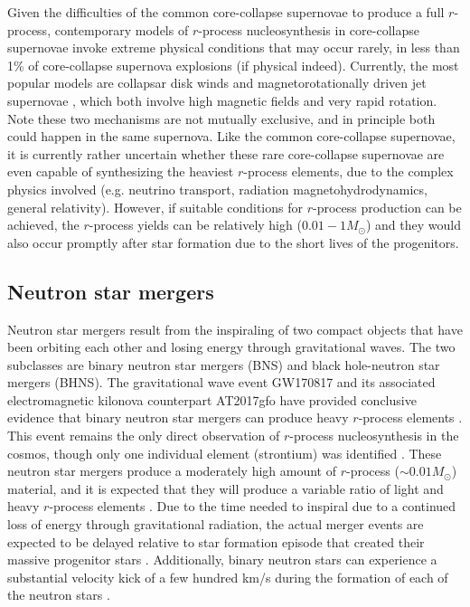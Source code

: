 \documentclass[letterpaper]{article}
\begin{document}
Given the difficulties of the common core-collapse supernovae to produce a full $r$-process, contemporary models of $r$-process nucleosynthesis in core-collapse supernovae invoke extreme physical conditions that may occur rarely, in less than 1\% of core-collapse supernova explosions (if physical indeed).
Currently, the most popular models are collapsar disk winds \citep{Pruet2004,Surman2011,Siegel2019,Miller2020} and magnetorotationally driven jet supernovae \citep{Winteler2012,Nishimura2015,Mosta2018,Halevi2018}, which both involve high magnetic fields and very rapid rotation. Note these two mechanisms are not mutually exclusive, and in principle both could happen in the same supernova.
Like the common core-collapse supernovae, it is currently rather uncertain whether these rare core-collapse supernovae are even capable of synthesizing the heaviest $r$-process elements, due to the complex physics involved (e.g. neutrino transport, radiation magnetohydrodynamics, general relativity).
However, if suitable conditions for $r$-process production can be achieved, the $r$-process yields can be relatively high ($0.01-1 M_\odot$) and they would also occur promptly after star formation due to the short lives of the progenitors.



\subsection{Neutron star mergers}

Neutron star mergers  result from the inspiraling of two compact objects that have been orbiting each other and losing energy through gravitational waves. The two subclasses are binary neutron star mergers (BNS) and black hole-neutron star mergers (BHNS).
The gravitational wave event GW170817 and its associated electromagnetic kilonova counterpart AT2017gfo \citep{LIGOGW170817a,LIGOGW170817b} have provided conclusive evidence that binary neutron star mergers can produce heavy $r$-process elements \citep{Arcavi2017,Chornock2017,Coulter2017,Cowperthwaite2017,drout17,Evans2017,Kasliwal2017,kilpatrick17,McCully2017,Nicholl2017,Pian2017,shappee17,Smartt2017,Tanvir2017,Troja2017}. This event remains the only direct observation of $r$-process nucleosynthesis in the cosmos, though only one individual element (strontium) was identified \citep{Watson2019}.
These neutron star mergers produce a moderately high amount of $r$-process ($\sim 0.01 M_\odot$) material, and it is expected that they will produce a variable ratio of light  and heavy $r$-process elements \citep[e.g.,][]{Wu2016,Lippuner2017,Ji2019b}.
Due to the time needed to inspiral due to a continued loss of energy through gravitational radiation, the actual merger events are expected to be delayed relative to star formation episode that created their massive progenitor stars \citep[e.g.,][]{Dominik12}.
Additionally, binary neutron stars can experience a substantial velocity kick of a few hundred km/s during the formation of each of the neutron stars \citep[e.g.,][]{Willems2004,Dominik12,Fong2013,Beniamini2016,Bramante2016}.
\end{document}
